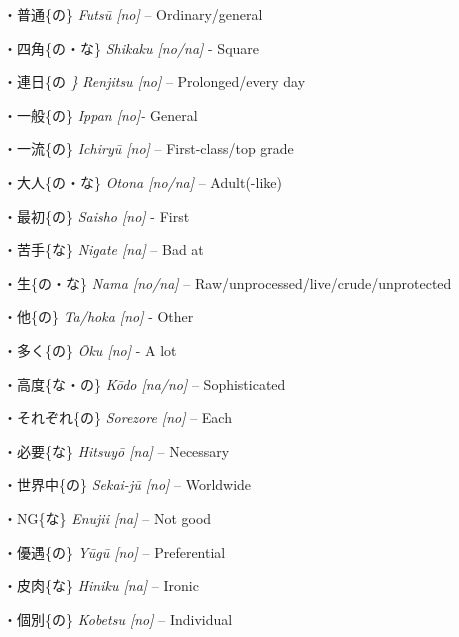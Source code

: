 \par{・普通\{の\} \emph{Futsū [no] }– Ordinary\slash general }

\par{・四角\{の・な\} \emph{Shikaku [no\slash na] }- Square }

\par{・連日\{の \emph{\} }\emph{Renjitsu [no] }– Prolonged\slash every day }

\par{・一般\{の\} \emph{Ippan [no]- }General }

\par{・一流\{の\} \emph{Ichiryū [no] }– First-class\slash top grade }

\par{・大人\{の・な\} \emph{Otona [no\slash na] }– Adult(-like) }

\par{・最初\{の\} \emph{Saisho [no] }- First }

\par{・苦手\{な\} \emph{Nigate [na] }– Bad at }

\par{・生\{の・な\} \emph{Nama [no\slash na] }– Raw\slash unprocessed\slash live\slash crude\slash unprotected }

\par{・他\{の\} \emph{Ta\slash hoka [no] }- Other }

\par{・多く\{の\} \emph{Ōku [no] }- A lot }

\par{・高度\{な・の\} \emph{Kōdo [na\slash no] }– Sophisticated }

\par{・それぞれ\{の\} \emph{Sorezore [no] }– Each }

\par{・必要\{な\} \emph{Hitsuyō [na] }– Necessary }

\par{・世界中\{の\} \emph{Sekai-jū [no] }– Worldwide }

\par{・NG\{な\} \emph{Enujii [na] }– Not good }

\par{・優遇\{の\} \emph{Yūgū [no] }– Preferential }

\par{・皮肉\{な\} \emph{Hiniku [na] }– Ironic }

\par{・個別\{の\} \emph{Kobetsu [no] }– Individual }


